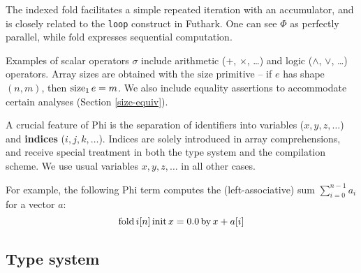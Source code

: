 The indexed fold facilitates a simple repeated iteration with an accumulator, and is closely related to the \texttt{loop} construct in Futhark. One can see $\Phi$ as perfectly parallel, while $\mathrm{fold}$ expresses sequential computation.

Examples of scalar operators $\sigma$ include arithmetic ($+$, $\times$, \dots) and logic ($\land$, $\lor$, \dots) operators. Array sizes are obtained with the $\mathrm{size}$ primitive -- if $e$ has shape $(n, m)$, then $\mathrm{size}_{1}\, {e} = m$. We also include equality assertions to accommodate certain analyses (Section \ref{size-equiv}).

A crucial feature of Phi is the separation of identifiers into variables ($x, y, z, \dots$) and \textbf{indices} ($i, j, k, \dots$). Indices are solely introduced in array comprehensions, and receive special treatment in both the type system and the compilation scheme. We use usual variables $x, y, z, \dots$ in all other cases.

For example, the following Phi term computes the (left-associative) sum $\sum_{i=0}^{n-1} a_i$ for a vector $a$:
$$ \mathrm{fold}\,{i}[{n}]\,\mathrm{init}\,{x} = {0.0}\,\mathrm{by}\,{x + a[i]} $$

\subsection{Type system}

\newcommand{\phifloattype}{\mathrm{Float}}
\newcommand{\phiinttype}{\mathrm{Int}}
\newcommand{\phinattype}{\phiinttype}
\newcommand{\phibooltype}{\mathrm{Bool}}
\newcommand{\phivectype}[1]{\Box{#1}}
\newcommand{\phipairtype}[2]{{#1} \times {#2}}

